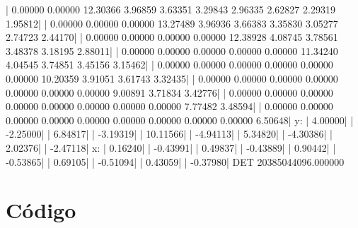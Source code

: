 \documentclass{homework}
\begin{document}
\begin{fortran}
	|   0.00000    0.00000   12.30366    3.96859    3.63351    3.29843    2.96335    2.62827    2.29319    1.95812|
	|   0.00000    0.00000    0.00000   13.27489    3.96936    3.66383    3.35830    3.05277    2.74723    2.44170|
	|   0.00000    0.00000    0.00000    0.00000   12.38928    4.08745    3.78561    3.48378    3.18195    2.88011|
	|   0.00000    0.00000    0.00000    0.00000    0.00000   11.34240    4.04545    3.74851    3.45156    3.15462|
	|   0.00000    0.00000    0.00000    0.00000    0.00000    0.00000   10.20359    3.91051    3.61743    3.32435|
	|   0.00000    0.00000    0.00000    0.00000    0.00000    0.00000    0.00000    9.00891    3.71834    3.42776|
	|   0.00000    0.00000    0.00000    0.00000    0.00000    0.00000    0.00000    0.00000    7.77482    3.48594|
	|   0.00000    0.00000    0.00000    0.00000    0.00000    0.00000    0.00000    0.00000    0.00000    6.50648|
	y:
	|   4.00000|
	|  -2.25000|
	|   6.84817|
	|  -3.19319|
	|  10.11566|
	|  -4.94113|
	|   5.34820|
	|  -4.30386|
	|   2.02376|
	|  -2.47118|
	x:
	|   0.16240|
	|  -0.43991|
	|   0.49837|
	|  -0.43889|
	|   0.90442|
	|  -0.53865|
	|   0.69105|
	|  -0.51094|
	|   0.43059|
	|  -0.37980|
	DET
	20385044096.000000
	\end{fortran}

	\pagebreak
	\appendixpage
	\appendix \section*{Código}
	
	
%		
\end{document}

